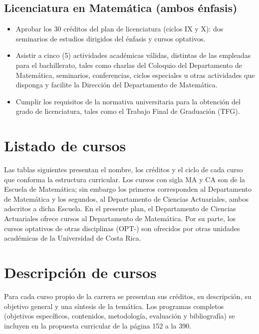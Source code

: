 \documentclass[11pt,a4paper]{article}
\begin{document}
\subsection*{Licenciatura en Matemática (ambos énfasis)}
\begin{itemize}
  \item Aprobar los 30 créditos del plan de licenciatura (ciclos IX y X): dos seminarios de estudios dirigidos del énfasis y cursos optativos.
  \item Asistir a cinco (5) actividades académicas válidas, distintas de las empleadas para el bachillerato, tales como charlas del Coloquio del Departamento de Matemática, seminarios, conferencias, ciclos especiales u otras actividades que disponga y facilite la Dirección del Departamento de Matemática.
  \item Cumplir los requisitos de la normativa universitaria para la obtención del grado de licenciatura, tales como el Trabajo Final de Graduación (TFG).
\end{itemize}

\section{Listado de cursos}

Las tablas siguientes presentan el nombre, los créditos y el ciclo de cada curso que conforma la estructura curricular. Los cursos con sigla MA y CA son de la Escuela de Matemática; sin embargo los primeros corresponden al Departamento de Matemática y los segundos, al Departamento de Ciencias Actuariales, ambos adscritos a dicha Escuela. En el presente plan, el Departamento de Ciencias Actuariales ofrece cursos al Departamento de Matemática. Por su parte, los cursos optativos de otras disciplinas (OPT-) son ofrecidos por otras unidades académicas de la Universidad de Costa Rica.

\setcounter{table}{0}


\section{Descripción de cursos}

Para cada curso propio de la carrera se presentan sus créditos, su descripción, su objetivo general y una síntesis de la temática. Los programas completos (objetivos específicos, contenidos, metodología, evaluación y bibliografía) se incluyen en la propuesta curricular de la página 152 a la 390. 
\end{document}
